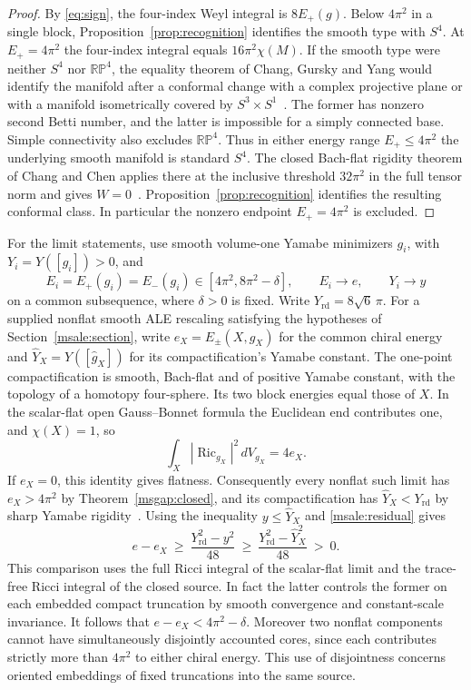 \documentclass[11pt]{article}
\numberwithin{equation}{section}
\theoremstyle{definition}
\theoremstyle{remark}
\DeclareMathOperator{\Ric}{Ric}
\newcommand{\rd}{\mathrm{rd}}
\begin{document}
\begin{proof}
By \eqref{eq:sign}, the four-index Weyl integral is \(8E_+(g)\).
Below \(4\pi^2\) in a single block, Proposition~\ref{prop:recognition}
identifies the smooth type with \(S^4\). At \(E_+=4\pi^2\) the
four-index integral equals \(16\pi^2\chi(M)\).
If the smooth type were neither \(S^4\) nor \(\mathbb{RP}^4\),
the equality theorem of Chang, Gursky and Yang would identify the
manifold after a conformal change with a complex projective plane
or with a manifold isometrically covered by
\(S^3\times S^1\)~\cite[Theorem B]{ChangGurskyYang2003}.
The former has nonzero second Betti number, and the latter
is impossible for a simply connected base. Simple connectivity
also excludes \(\mathbb{RP}^4\). Thus in either energy range
\(E_+\le4\pi^2\) the underlying smooth manifold is standard \(S^4\).
The closed Bach-flat rigidity theorem of Chang and Chen applies
there at the inclusive threshold \(32\pi^2\) in the full tensor
norm and gives \(W=0\)~\cite[Remark 2 and Theorem 2.1]{ChangChen2021RicciSphere}.
Proposition~\ref{prop:recognition} identifies the resulting
conformal class. In particular the nonzero endpoint
\(E_+=4\pi^2\) is excluded.
\end{proof}

For the limit statements, use smooth volume-one Yamabe minimizers
\(g_i\), with \(Y_i=Y([g_i])>0\), and
\[
 E_i=E_+(g_i)=E_-(g_i)\in[4\pi^2,8\pi^2-\delta],
 \qquad E_i\longrightarrow e,\qquad Y_i\longrightarrow y
\]
on a common subsequence, where \(\delta>0\) is fixed. Write
\(Y_{\rd}=8\sqrt6\,\pi\). For a supplied nonflat smooth ALE
rescaling satisfying the hypotheses of Section~\ref{msale:section},
write \(e_X=E_\pm(X,g_X)\) for the common chiral energy and
\(\widehat Y_X=Y([\widehat g_X])\) for its compactification's
Yamabe constant. The one-point compactification is smooth,
Bach-flat and of positive Yamabe constant, with the topology
of a homotopy four-sphere. Its two block energies equal those
of \(X\). In the scalar-flat open Gauss--Bonnet formula the
Euclidean end contributes one, and \(\chi(X)=1\), so
\[
 \int_X|\Ric_{g_X}|^2\,dV_{g_X}=4e_X .
\]
If \(e_X=0\), this identity gives flatness. Consequently every
nonflat such limit has \(e_X>4\pi^2\) by
Theorem~\ref{msgap:closed}, and its compactification has
\(\widehat Y_X<Y_{\rd}\) by sharp Yamabe
rigidity~\cite[Theorem 2]{Schoen1984Yamabe}. Using the
inequality \(y\le\widehat Y_X\) and \eqref{msale:residual} gives
\begin{equation}\label{msgap:strict}
 e-e_X\ \ge\ \frac{Y_{\rd}^2-y^2}{48}
 \ \ge\ \frac{Y_{\rd}^2-\widehat Y_X^2}{48}
 \ >\ 0 .
\end{equation}
This comparison uses the full Ricci integral of the scalar-flat
limit and the trace-free Ricci integral of the closed source.
In fact the latter controls the former on each embedded compact
truncation by smooth convergence and constant-scale invariance.
It follows that \(e-e_X<4\pi^2-\delta\).
Moreover two nonflat components cannot have simultaneously
disjointly accounted cores, since each contributes strictly more than
\(4\pi^2\) to either chiral energy. This use of disjointness concerns
oriented embeddings of fixed truncations into the same source.
\end{document}
